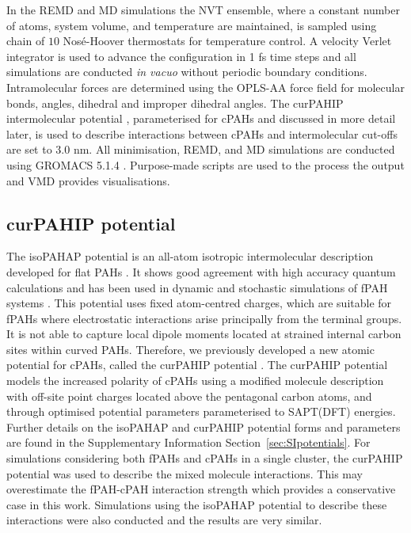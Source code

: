 In the REMD and MD simulations the NVT ensemble, where a constant number of atoms, system volume, and temperature are maintained, is sampled using chain of $10$ Nos\'{e}-Hoover thermostats for temperature control. A velocity Verlet integrator \cite{Verlet_1967} is used to advance the configuration in 1 fs time steps and all simulations are conducted \textit{in vacuo} without periodic boundary conditions.  Intramolecular forces are determined using the OPLS-AA force field \cite{Kaminski2001opls} for molecular bonds, angles, dihedral and improper dihedral angles. The curPAHIP intermolecular potential \cite{bowal2019ion}, parameterised for cPAHs and discussed in more detail later, is used to describe interactions between cPAHs and intermolecular cut-offs are set to $3.0$ nm. All minimisation, REMD, and MD simulations are conducted using GROMACS 5.1.4 \cite{Abraham2015}. Purpose-made scripts are used to the process the output and VMD \cite{Humphrey1996} provides visualisations.

\subsection{curPAHIP potential} 
The isoPAHAP potential is an all-atom isotropic intermolecular description developed for flat PAHs \cite{totton2010first}. It shows good agreement with high accuracy quantum calculations and has been used in dynamic and stochastic simulations of fPAH systems \cite{Totton2012quantitative,bowal2019sphere,Grancic2016,Pascazio2017}. This potential uses fixed atom-centred charges, which are suitable for fPAHs where electrostatic interactions arise principally from the terminal groups. It is not able to capture local dipole moments located at strained internal carbon sites within curved PAHs. Therefore, we previously developed a new atomic potential for cPAHs, called the curPAHIP potential \cite{bowal2019ion}. The curPAHIP potential models the increased polarity of cPAHs using a modified molecule description with off-site point charges located above the pentagonal carbon atoms, and through optimised potential parameters parameterised to SAPT(DFT) energies. Further details on the isoPAHAP and curPAHIP potential forms and parameters are found in the Supplementary Information Section~\ref{sec:SIpotentials}. For simulations considering both fPAHs and cPAHs in a single cluster, the curPAHIP potential was used to describe the mixed molecule interactions. This may overestimate the fPAH-cPAH interaction strength which provides a conservative case in this work. Simulations using the isoPAHAP potential to describe these interactions were also conducted and the results are very similar.

